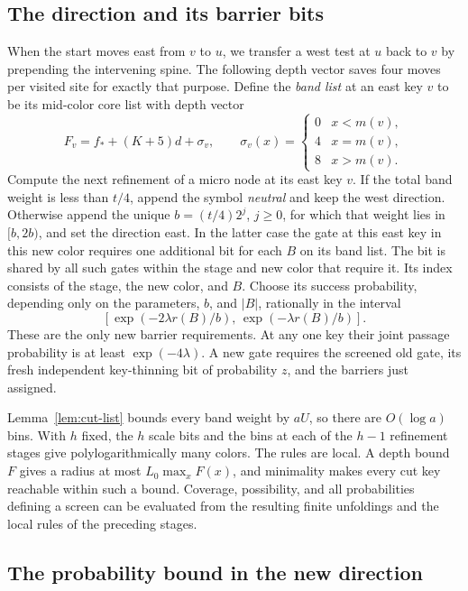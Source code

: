 \subsection{The direction and its barrier bits}

When the start moves east from \(v\) to \(u\), we transfer a west test
at \(u\) back to \(v\) by prepending the intervening spine. The
following depth vector saves four moves per visited site for exactly
that purpose. Define the \emph{band list} at an east key \(v\) to be
its mid-color core list with depth vector
\[
 F_v=f_*+(K+5)d+\sigma_v,\qquad
 \sigma_v(x)=
 \begin{cases}
 0& x<m(v),\\
 4& x=m(v),\\
 8& x>m(v).
 \end{cases}
\]
Compute the next refinement of a micro node at its east key \(v\).
If the total band weight is less than \(t/4\), append the symbol
\emph{neutral} and keep the west direction. Otherwise append the
unique \(b=(t/4)2^j\), \(j\ge0\), for which that weight lies in
\([b,2b)\), and set the direction east. In the latter case the gate
at this east key in this new color requires one additional bit for
each \(B\) on its band list. The bit is shared by all such gates
within the stage and new color that require it. Its index consists
of the stage, the new color, and \(B\). Choose its success
probability, depending only on the parameters, \(b\), and \(|B|\),
rationally in the interval
\[
 [\exp(-2\lambda r(B)/b),\,\exp(-\lambda r(B)/b)] .
\]
These are the only new barrier requirements. At any one key their
joint passage probability is at least \(\exp(-4\lambda)\). A new
gate requires the screened old gate, its fresh independent
key-thinning bit of probability \(z\), and the barriers just assigned.

Lemma~\ref{lem:cut-list} bounds every band weight by \(aU\), so there
are \(O(\log a)\) bins. With \(h\) fixed, the \(h\) scale bits and the
bins at each of the \(h-1\) refinement stages give polylogarithmically
many colors. The rules are local. A depth bound \(F\) gives a radius
at most \(L_0\max_x F(x)\), and minimality makes every cut key
reachable within such a bound. Coverage, possibility, and all
probabilities defining a screen can be evaluated from the resulting
finite unfoldings and the local rules of the preceding stages.

\subsection{The probability bound in the new direction}

